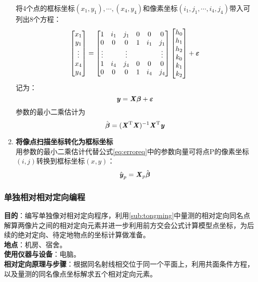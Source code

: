 \begin{enumerate}
\begin{solution}
将4个点的框标坐标$(x_1,y_1),\cdots,(x_4,y_4)$和像素坐标$(i_1,j_1,\cdots,i_4,j_4)$带入可列出8个方程：
\begin{equation}
\begin{bmatrix}
x_1 \\ y_1 \\ \vdots \\ x_4 \\ y_4 
\end{bmatrix}
=
\begin{bmatrix}
1 & i_1 & j_1 & 0 & 0 & 0\\
0 & 0 & 0 & 1 & i_1 & j_1 \\
\vdots & & \vdots & & & \vdots \\
1 & i_4 & j_4 & 0 & 0 & 0\\
0 & 0 & 0 & 1 & i_4 & j_4 
\end{bmatrix}
\begin{bmatrix}
h_0 \\ h_1 \\ h_2 \\ k_0 \\ k_1 \\ k_2
\end{bmatrix}
+\boldsymbol{\varepsilon} 
\end{equation}
记为：
\begin{equation}
\boldsymbol{\mathit{y}}=\boldsymbol{\mathit{X}}\boldsymbol{\beta}+\boldsymbol{\varepsilon}
\end{equation}
参数的最小二乘估计为
\begin{equation}
\hat{\boldsymbol{\beta}}=(\boldsymbol{\mathit{X}}^\mathrm{T}\boldsymbol{\mathit{X}})^{-1}\boldsymbol{\mathit{X}}^\mathrm{T}\boldsymbol{\mathit{y}}
\end{equation}
\end{solution}
\item \textbf{将像点扫描坐标转化为框标坐标}\\
用参数的最小二乘估计代替公式\ref{eq:erroreq}中的参数向量可将点P的像素坐标$(i,j)$转换到框标坐标$(x,y)$：
\begin{equation}
\hat{\boldsymbol{\mathit{y}}}_p=\boldsymbol{\mathit{X}}_p\hat{\boldsymbol{\beta}}
\end{equation}
\end{enumerate}

\subsubsection{单独相对相对定向编程}

\noindent\textbf{目的}：编写单独像对相对定向程序，利用\ref{sub:tongming}中量测的相对定向同名点解算两像片之间的相对定向元素并进一步利用前方交会公式计算模型点坐标，为后续的绝对定向、待定地物点的坐标计算做准备。\\
\textbf{地点}：机房、宿舍。\\
\textbf{使用仪器与设备}：电脑。 \\
\textbf{相对定向原理与步骤}：根据同名射线相交位于同一个平面上，利用共面条件方程，以及量测的同名像点坐标解求五个相对定向元素。

